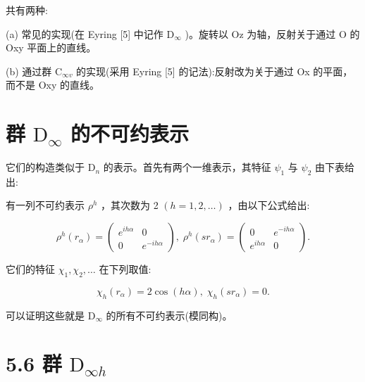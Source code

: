 \documentclass[10pt]{article}
\begin{document}
共有两种:

(a) 常见的实现(在 Eyring [5] 中记作 \({\mathrm{D}}_{\infty }\) )。旋转以 Oz 为轴，反射关于通过 O 的 Oxy 平面上的直线。

(b) 通过群 \({\mathrm{C}}_{\infty v}\) 的实现(采用 Eyring [5] 的记法):反射改为关于通过 Ox 的平面，而不是 Oxy 的直线。

\section*{群 \({\mathrm{D}}_{\infty }\) 的不可约表示}

它们的构造类似于 \({\mathrm{D}}_{n}\) 的表示。首先有两个一维表示，其特征 \({\psi }_{1}\) 与 \({\psi }_{2}\) 由下表给出:

\begin{center}
\end{center}

有一列不可约表示 \({\rho }^{h}\) ，其次数为 2 \(\left( {h = 1,2,\ldots }\right)\) ，由以下公式给出:

\[
{\rho }^{h}\left( {r}_{\alpha }\right)  = \left( \begin{matrix} {e}^{ih\alpha } & 0 \\  0 & {e}^{-{ih\alpha }} \end{matrix}\right) ,\;{\rho }^{h}\left( {s{r}_{\alpha }}\right)  = \left( \begin{matrix} 0 & {e}^{-{ih\alpha }} \\  {e}^{ih\alpha } & 0 \end{matrix}\right) .
\]

它们的特征 \({\chi }_{1},{\chi }_{2},\ldots\) 在下列取值:

\[
{\chi }_{h}\left( {r}_{\alpha }\right)  = 2\cos \left( {h\alpha }\right) ,\;{\chi }_{h}\left( {s{r}_{\alpha }}\right)  = 0.
\]

可以证明这些就是 \({\mathrm{D}}_{\infty }\) 的所有不可约表示(模同构)。

\section*{5.6 群 \({\mathrm{D}}_{\infty h}\)}
\end{document}
